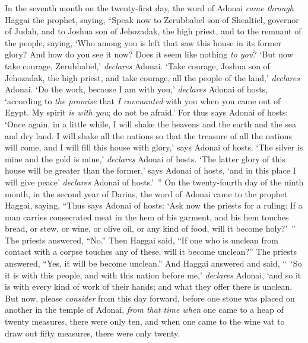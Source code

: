 \begin{biblechapter} %
 In the seventh month on the twenty-first day, the word of Adonai \textit{came through} Haggai the prophet, saying,
\verse “Speak now to Zerubbabel son of Shealtiel, governor of Judah, and to Joshua son of Jehozadak, the high priest, and to the remnant of the people, saying,
\verse ‘Who among you is left that saw this house in its former glory? And how do you see it now? Does it seem like nothing \textit{to you}?
\verse ‘But now take courage, Zerubbabel,’ \textit{declares} Adonai. ‘Take courage, Joshua son of Jehozadak, the high priest, and take courage, all the people of the land,’ \textit{declares} Adonai. ‘Do the work, because I am with you,’ \textit{declares} Adonai of hosts,
\verse ‘according to \textit{the promise} that \textit{I covenanted} with you when you came out of Egypt. My spirit \textit{is with you}; do not be afraid.’
\verse For thus says Adonai of hosts: ‘Once again, in a little while, I will shake the heavens and the earth and the sea and dry land.
\verse I will shake all the nations so that the treasure of all the nations will come, and I will fill this house with glory,’ says Adonai of hosts.
\verse ‘The silver is mine and the gold is mine,’ \textit{declares} Adonai of hosts.
\verse ‘The latter glory of this house will be greater than the former,’ says Adonai of hosts, ‘and in this place I will give peace’ \textit{declares} Adonai of hosts.’ ”
\verse On the twenty-fourth day of the ninth month, in the second year of Darius, the word of Adonai came to the prophet Haggai, saying,
\verse “Thus says Adonai of hosts: ‘Ask now the priests for a ruling:
\verse If a man carries consecrated meat in the hem of his garment, and his hem touches bread, or stew, or wine, or olive oil, or any kind of food, will it become holy?’ ” The priests answered, “No.”
\verse Then Haggai said, “If one who is unclean from contact with a corpse touches any of these, will it become unclean?” The priests answered, “Yes, it will be become unclean.”
\verse And Haggai answered and said, “ ‘So it is with this people, and with this nation before me,’ \textit{declares} Adonai, ‘and so it is with every kind of work of their hands; and what they offer there is unclean.
\verse But now, please \textit{consider} from this day forward, before one stone was placed on another in the temple of Adonai,
\verse \textit{from that time when} one came to a heap of twenty measures, there were only ten, and when one came to the wine vat to draw out fifty measures, there were only twenty.

\end{biblechapter}
